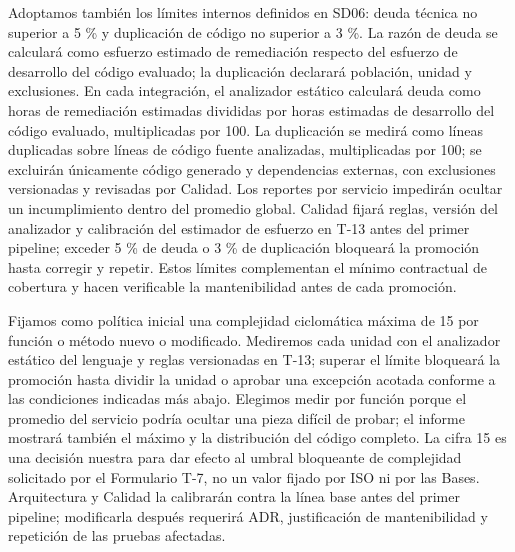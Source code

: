 \documentclass[11pt]{article}
\begin{document}
Adoptamos también los límites internos definidos en SD06: deuda técnica no superior a 5 \% y duplicación de código no superior a 3 \%. La razón de deuda se calculará como esfuerzo estimado de remediación respecto del esfuerzo de desarrollo del código evaluado; la duplicación declarará población, unidad y exclusiones. En cada integración, el analizador estático calculará deuda como horas de remediación estimadas divididas por horas estimadas de desarrollo del código evaluado, multiplicadas por 100. La duplicación se medirá como líneas duplicadas sobre líneas de código fuente analizadas, multiplicadas por 100; se excluirán únicamente código generado y dependencias externas, con exclusiones versionadas y revisadas por Calidad. Los reportes por servicio impedirán ocultar un incumplimiento dentro del promedio global. Calidad fijará reglas, versión del analizador y calibración del estimador de esfuerzo en T-13 antes del primer pipeline; exceder 5 \% de deuda o 3 \% de duplicación bloqueará la promoción hasta corregir y repetir. Estos límites complementan el mínimo contractual de cobertura y hacen verificable la mantenibilidad antes de cada promoción.

Fijamos como política inicial una complejidad ciclomática máxima de 15 por función o método nuevo o modificado. Mediremos cada unidad con el analizador estático del lenguaje y reglas versionadas en T-13; superar el límite bloqueará la promoción hasta dividir la unidad o aprobar una excepción acotada conforme a las condiciones indicadas más abajo. Elegimos medir por función porque el promedio del servicio podría ocultar una pieza difícil de probar; el informe mostrará también el máximo y la distribución del código completo. La cifra 15 es una decisión nuestra para dar efecto al umbral bloqueante de complejidad solicitado por el Formulario T-7, no un valor fijado por ISO ni por las Bases. Arquitectura y Calidad la calibrarán contra la línea base antes del primer pipeline; modificarla después requerirá ADR, justificación de mantenibilidad y repetición de las pruebas afectadas.
\end{document}

